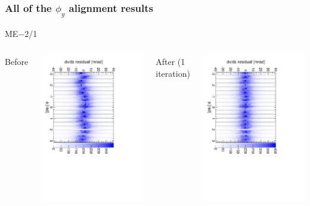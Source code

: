 \documentclass[compress]{beamer}
\begin{document}
\begin{frame}
\frametitle{All of the $\phi_y$ alignment results}
\begin{center}
ME$-$2/1
\end{center}

\begin{columns}
\centering Before

\includegraphics[height=\linewidth, angle=90]{iter01_mem21.pdf}

\centering After (1 iteration)

\includegraphics[height=\linewidth, angle=90]{iter02_mem21.pdf}
\end{columns}


\end{frame}
\end{document}
